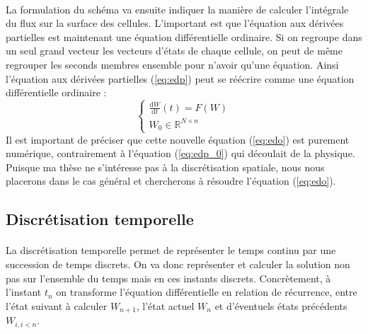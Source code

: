 		\paragraph{}
		La formulation du schéma va ensuite indiquer la manière de calculer l'intégrale du flux sur la surface des cellules.
		L'important est que l'équation aux dérivées partielles est maintenant une équation différentielle ordinaire.
		Si on regroupe dans un seul grand vecteur les vecteurs d'états de chaque cellule, on peut de même regrouper les seconds membres ensemble pour n'avoir qu'une équation.
		Ainsi l'équation aux dérivées partielles (\ref{eq:edp}) peut se réécrire comme une équation différentielle ordinaire :
		\begin{equation}\label{eq:edo}
			\left\{\begin{aligned}
				\frac{\mathrm{d}W}{\mathrm{d}t}\left(t\right) = F\left(W\right) \\
				W_0\in\mathbb{R}^{N\times n}
			\end{aligned}\right.
		\end{equation}
		Il est important de préciser que cette nouvelle équation (\ref{eq:edo}) est purement numérique, contrairement à l'équation (\ref{eq:edp_0}) qui découlait de la physique.
		Puisque ma thèse ne s'intéresse pas à la discrétisation spatiale, nous nous placerons dans le cas général et chercherons à résoudre l'équation (\ref{eq:edo}).

	\subsection{Discrétisation temporelle}

		\paragraph{}
		La discrétisation temporelle permet de représenter le temps continu par une succession de temps discrets.
		On va donc représenter et calculer la solution non pas sur l'ensemble du temps mais en ces instants discrets.
		Concrètement, à l'instant $t_n$ on transforme l'équation différentielle en relation de récurrence, entre l'état suivant à calculer $W_{n+1}$, l'état actuel $W_n$ et d'éventuels états précédents $W_{i,i<n}$.

